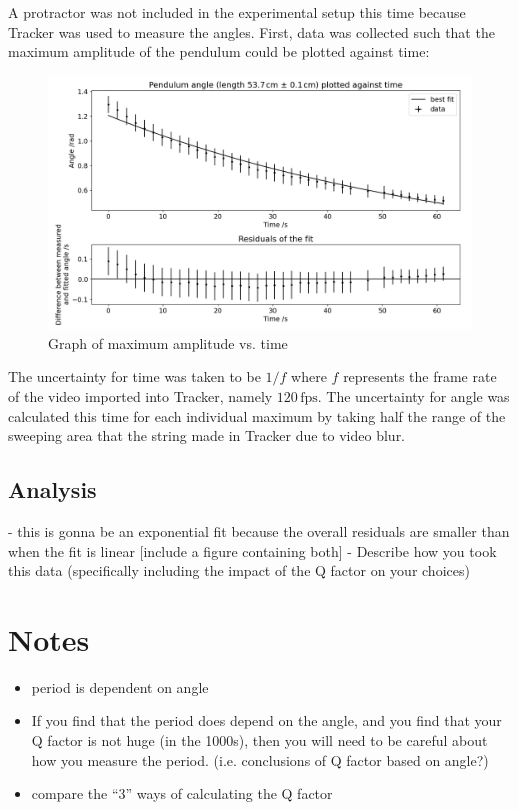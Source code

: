 \documentclass[12pt]{article}
\begin{document}
A protractor was not included in the experimental setup this time because Tracker \cite{tracker} was used to measure the angles. First, data was collected such that the maximum amplitude of the pendulum could be plotted against time:

\begin{figure}[!hptb]
    \centering
    \includegraphics[width=\textwidth]{../figures/max_amplitude_vs_time.png}
    \caption{\centering Graph of maximum amplitude vs. time}
    \label{fig:figure 4}
\end{figure}

The uncertainty for time was taken to be $1/f$ where $f$ represents the frame rate of the video imported into Tracker, namely $120\,\text{fps}$. The uncertainty for angle was calculated this time for each individual maximum by taking half the range of the sweeping area that the string made in Tracker due to video blur.

\subsection{Analysis}
- this is gonna be an exponential fit because the overall residuals are smaller than when the fit is linear [include a figure containing both]
- Describe how you took this data (specifically including the impact of the Q factor on your choices)

\section{Notes}


\begin{itemize}
    \item period is dependent on angle \cite*{what-is-yeast}
    \item If you find that the period does depend on the angle, and you find that your Q factor is not huge (in the 1000s), then you will need to be careful about how you measure the period. (i.e. conclusions of Q factor based on angle?)
    \item compare the ``3'' ways of calculating the Q factor
\end{itemize}
\end{document}
